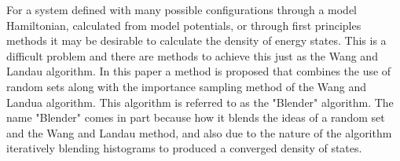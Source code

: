 \documentclass[twocolumn]{article}
\begin{document}
For a system defined with many possible configurations through a model Hamiltonian, calculated from model potentials, or through first principles methods it may be desirable to calculate the density of energy states.  This is a difficult problem and there are methods to achieve this just as the Wang and Landau algorithm.  In this paper a method is proposed that combines the use of random sets along with the importance sampling method of the Wang and Landua algorithm. This algorithm is referred to as the "Blender" algorithm. The name "Blender" comes in part because how it blends the ideas of a random set and the Wang and Landau method, and also due to the nature of the algorithm iteratively blending histograms to produced a converged density of states. 
\end{document}
